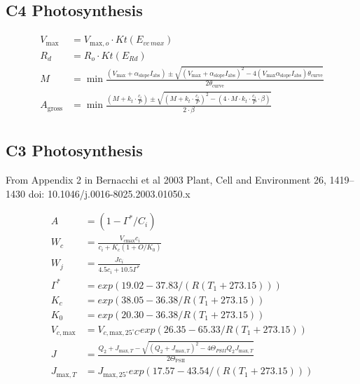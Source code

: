 \documentclass[12pt]{report}
\begin{document}
\subsection*{C4 Photosynthesis}
\begin{align}
 V_{\text{max}}  &= V_{\text{max},o} \cdot Kt(E_{vc\,max}) \label{eqn:Vcmax} \\
 R_{d}  &=  R_{o} \cdot Kt(E_{Rd}) \label{eqn:Rd} \\
 M &= \min\frac{\scriptstyle(V_{\text{max}}+\alpha_{\text{slope}}  I_{\text{abs}}) \pm \sqrt{(V_{\text{max}}+\alpha_{\text{slope}} I_{\text{abs}})^{2} - 4  (V_{\text{max}} \alpha_{\text{slope}}  I_{\text{abs}}) \theta_{\text{curve}}}}{2  \theta_{\text{curve}}} \label{eqn:M} \\
 A_{\text{gross}} &= \min \frac{ \left( M + k_{t} \cdot \frac{c_{i}}{P} \right) \pm \sqrt{ \left(M + k_{t} \cdot \frac{c_{i}}{P} \right)^2 - \left( 4 \cdot M \cdot k_{t} \cdot \frac{c_{i}}{P} \cdot \beta \right)}}{2 \cdot \beta} \label{eqn:Agross} \\
\end{align}


\subsection*{C3 Photosynthesis}

From Appendix 2 in Bernacchi et al 2003 Plant, Cell and Environment 26, 1419–1430  doi: 10.1046/j.0016-8025.2003.01050.x

\begin{align}
A &= \left(1-\Gamma^{*}/C_i\right) \\
W_c &= \frac{V_{c\text{max}}c_i}{c_i+K_c(1+O/K_0)}\\
W_j &= \frac{Jc_i}{4.5c_i + 10.5\Gamma^{*}}\\
\Gamma^{*} &= exp(19.02 - 37.83/(R(T_1+273.15)))\\
K_c &= exp(38.05-36.38/R(T_1+273.15))\\
K_0&=exp(20.30-36.38/R(T_1+273.15))\\
V_{c,\text{max}}&=V_{c,\text{max},25^{\circ}C}exp(26.35-65.33/R(T_1+273.15))\\
J&=\frac{Q_2+J_{\text{max},T}-\sqrt{(Q_2+J_{\text{max},T})^2-4\Theta_{PSII}Q_2J_{\text{max},T}}}{2\Theta_{\text{PSII}}}\\
J_{\text{max},T}&=J_{\text{max},25^{\circ}}exp(17.57-43.54/(R(T_1+273.15))) \\
\end{align}
\end{document}
